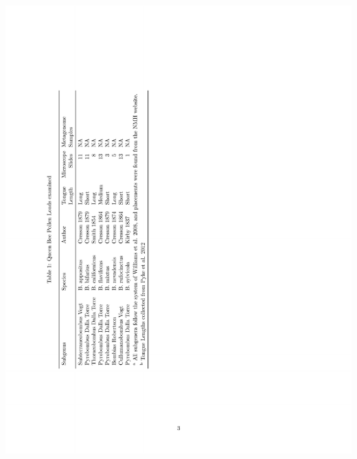 \documentclass[
]{article}
\begin{document}
\includegraphics{../graphics/tables/bombus_samples.pdf}

\newpage
\end{document}
